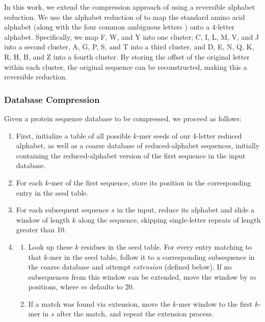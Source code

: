 \documentclass[review,preprint,12pt]{elsarticle}
\theoremstyle{definition}
\theoremstyle{remark}
\begin{document}
In this work, we extend the compression approach of 
\citet{daniels2013compressive} using a reversible alphabet reduction.
We use the alphabet reduction of \citet{murphy2000simplified} to map the 
standard amino
acid alphabet (along with the four common ambiguous letters ) onto a 4-letter 
alphabet.
Specifically, we map F, W, and Y into one cluster; C, I, L, M, V, and J into
a second cluster, A, G, P, S, and T into a third cluster, and
D, E, N, Q, K, R, H, B, and Z into a fourth cluster.
By storing the offset of the original letter within each cluster, the original
sequence can be reconstructed, making this a reversible reduction.

\subsubsection{Database Compression}

Given a protein sequence database to be compressed, we proceed as follows:
\begin{enumerate}
        \item First, initialize a table of all possible $k$-mer seeds of
        our 4-letter reduced alphabet, as well as a coarse database of
        reduced-alphabet sequences, initially containing the reduced-alphabet
        version of the first sequence in the input database.
        \item For each $k$-mer of the first sequence, store its position in the
        corresponding entry in the seed table.
        \item For each subsequent sequence $s$ in the input, reduce its 
        alphabet and slide a window of 
        length $k$ along the sequence, skipping single-letter repeats of length
        greater than 10.
        \item
        \begin{enumerate}
        \item Look up these $k$ residues in the seed table.
        For every entry matching to that $k$-mer in the seed table, follow
        it to a corresponding subsequence in the coarse database and attempt
        \textit{extension} (defined below).
        If no subsequences from this window can be extended, move the window
        by $m$ positions, where $m$ defaults to 20.
        \item If a match was found via extension, move the $k$-mer window to
        the first $k$-mer in $s$ after the match, and repeat the extension
        process.
        \end{enumerate}
\end{enumerate}
        
\end{document}
